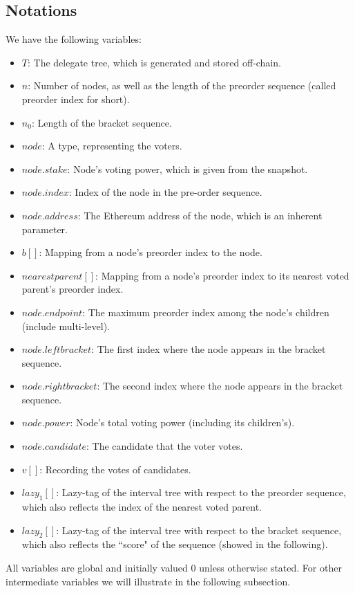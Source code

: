 \subsection{Notations}
We have the following variables:
\begin{itemize}
	\item $T$: The delegate tree, which is generated and stored off-chain. 
	\item $n$: Number of nodes, as well as the length of the preorder sequence (called preorder index for short). 
	\item $n_0$: Length of the bracket sequence. 
	\item $node$: A type, representing the voters. 
	\item $node.stake$: Node's voting power, which is given from the snapshot.
	\item $node.index$: Index of the node in the pre-order sequence.
	\item $node.address$: The Ethereum address of the node, which is an inherent  
	parameter.
	\item $b[]$: Mapping from a node's preorder index to the node.
	\item $nearestparent[]$: Mapping from a node's preorder index to its nearest voted parent's preorder index.
	\item $node.endpoint$: The maximum preorder index among the node's children (include multi-level).
	\item $node.leftbracket$: The first index where the node appears in the bracket sequence. 
	\item $node.rightbracket$: The second index where the node appears in the bracket sequence. 
	\item $node.power$: Node's total voting power (including its children's).
	\item $node.candidate$: The candidate that the voter votes.
	\item $v[]$: Recording the votes of candidates.
	\item $lazy_1[]$: Lazy-tag of the interval tree with respect to the preorder sequence, which also reflects the index of the nearest voted parent.
	\item $lazy_2[]$: Lazy-tag of the interval tree with respect to the bracket sequence, which also reflects the ``score" of the sequence (showed in the following).
\end{itemize}
All variables are global and initially valued 0 unless otherwise stated.  For other intermediate variables we will illustrate in the following subsection.

